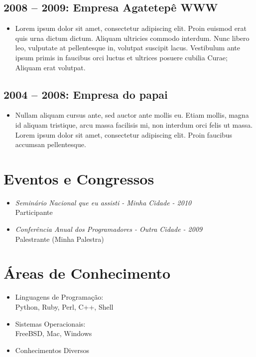 \documentclass[a4paper]{article}
\begin{document}
\subsection*{2008 -- 2009: Empresa Agatetepê WWW}
\begin{itemize}
\item Lorem ipsum dolor sit amet, consectetur adipiscing elit. Proin euismod erat quis urna dictum dictum. Aliquam ultricies commodo interdum. Nunc libero leo, vulputate at pellentesque in, volutpat suscipit lacus. Vestibulum ante ipsum primis in faucibus orci luctus et ultrices posuere cubilia Curae; Aliquam erat volutpat.
\end{itemize}

\subsection*{2004 -- 2008: Empresa do papai}
\begin{itemize}
\item Nullam aliquam cursus ante, sed auctor ante mollis eu. Etiam mollis, magna id aliquam tristique, arcu massa facilisis mi, non interdum orci felis ut massa. Lorem ipsum dolor sit amet, consectetur adipiscing elit. Proin faucibus accumsan pellentesque.
\end{itemize}

\vspace{1.5\baselineskip}
\hline

%
%
\pagebreak
\section*{Eventos e Congressos}
\begin{itemize}
	\item \emph{Seminário Nacional que eu assisti - Minha Cidade - 2010} \\ Participante
	\item \emph{Conferência Anual dos Programadores - Outra Cidade - 2009} \\ Palestrante (Minha Palestra)
\end{itemize}

\vspace{1.5\baselineskip}
\hline
%
%
\section*{Áreas de Conhecimento}
\begin{itemize}
	\item Linguagens de Programação: \\ Python, Ruby, Perl, C++, Shell
	\item Sistemas Operacionais: \\ FreeBSD, Mac, Windows
	\item Conhecimentos Diversos
\end{itemize}

\vspace{8\baselineskip}
\end{document}
